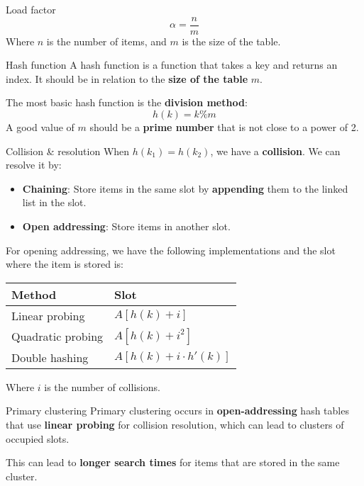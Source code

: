 \begin{knBox}
    {Load factor}
    \[
        \alpha = \frac{n}{m}
    \]
    Where $n$ is the number of items, and $m$ is the size of the table.
\end{knBox}

\begin{theorem}
    {Hash function}
    A hash function is a function that takes a key and returns an index. It should be in relation to the \textbf{size of the table} $m$.

    The most basic hash function is the \textbf{division method}:
    \[
        h(k) = k \% m
    \]
    A good value of $m$ should be a \textbf{prime number} that is not close to a power of 2.
\end{theorem}
\label{thm:hash-function}

\begin{theorem}
    {Collision \& resolution}
    When $h(k_1) = h(k_2)$, we have a \textbf{collision}. We can resolve it by:
    \begin{itemize}
        \item \textbf{Chaining}: Store items in the same slot by \textbf{appending} them to the linked list in the slot.
        \item \textbf{Open addressing}: Store items in another slot.
    \end{itemize}
    For opening addressing, we have the following implementations and the slot where the item is stored is:

    \begin{tabular}{|l|l|}
        \hline
        \textbf{Method}   & \textbf{Slot}             \\
        \hline
        Linear probing    & $A[h(k) + i]$             \\
        Quadratic probing & $A[h(k) + i^2]$           \\
        Double hashing    & $A[h(k) + i \cdot h'(k)]$ \\
        \hline
    \end{tabular}

    Where $i$ is the number of collisions.
\end{theorem}
\label{thm:collision-resolution}

\begin{knBox}
    {Primary clustering}
    Primary clustering occurs in \textbf{open-addressing} hash tables that use \textbf{linear probing} for collision resolution, which can lead to clusters of occupied slots.

    This can lead to \textbf{longer search times} for items that are stored in the same cluster.
\end{knBox}

